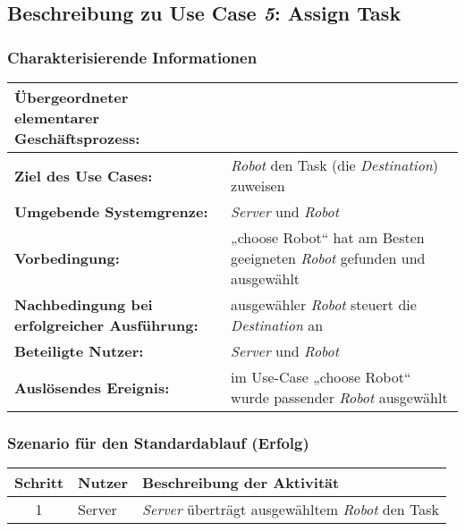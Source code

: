 \documentclass[includeheaders]{scrartcl}
\begin{document}

		\subsection{Beschreibung zu Use Case \emph{5}: Assign Task}

			\subsubsection*{Charakterisierende Informationen}

			\begin{table}[H]
				\centering
				\begin{tabularx}{\textwidth}{@{}p{5cm}X@{}}
				\toprule
				\textbf{Übergeordneter elementarer Geschäftsprozess:} & \\ \midrule
				\textbf{Ziel des Use Cases:} & \emph{Robot} den Task (die \emph{Destination}) zuweisen\\ \midrule
				\textbf{Umgebende Systemgrenze:} & \emph{Server} und \emph{Robot} \\ \midrule
				\textbf{Vorbedingung:} & „choose Robot“ hat am Besten geeigneten \emph{Robot} gefunden und ausgewählt\\ \midrule
				\textbf{Nachbedingung bei erfolgreicher Ausführung:} & ausgewähler \emph{Robot} steuert die \emph{Destination} an\\ \midrule
				\textbf{Beteiligte Nutzer:} & \emph{Server} und \emph{Robot}\\ \midrule
				\textbf{Auslösendes Ereignis:} & im Use-Case „choose Robot“ wurde passender \emph{Robot} ausgewählt\\
				\bottomrule
				\end{tabularx}
			\end{table}

			\subsubsection*{Szenario für den Standardablauf (Erfolg)}

			\begin{table}[H]
				\centering
				\begin{tabularx}{\textwidth}{@{}cp{2cm}X@{}}
				\toprule
				Schritt & Nutzer & Beschreibung der Aktivität \\ \midrule
				1 & Server & \emph{Server} überträgt ausgewähltem \emph{Robot} den Task \\
				\bottomrule
				\end{tabularx}
			\end{table}
\end{document}
